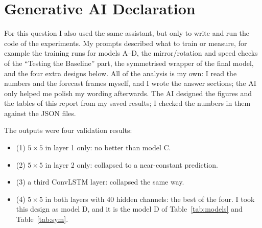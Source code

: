 \documentclass[11pt,letterpaper]{article}
\begin{document}
\section*{Generative AI Declaration}

For this question I also used the same assistant, but only to write and run the code
of the experiments. My prompts described what to train or measure, for example the training runs for
models A--D, the mirror/rotation and speed checks of the ``Testing the Baseline'' part, the symmetrised
wrapper of the final model, and the four extra designs below. All of the analysis is my own: I read the numbers and the forecast frames
myself, and I wrote the answer sections; the AI only helped me polish my wording afterwards. The AI
designed the figures and the tables of this report from my saved results; I checked the numbers in them
against the JSON files.

The outputs were four validation results:
\begin{itemize}
  \item (1) $5\times5$ in layer 1 only: no better than model C.
  \item (2) $5\times5$ in layer 2 only: collapsed to a near-constant prediction.
  \item (3) a third ConvLSTM layer: collapsed the same way.
  \item (4) $5\times5$ in both layers with 40 hidden channels: the best of the four. I took this design as
  model D, and it is the model D of Table~\ref{tab:models} and Table~\ref{tab:sym}.
\end{itemize}
\end{document}
